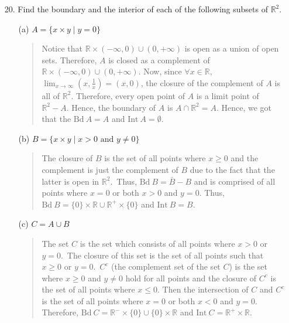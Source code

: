 \documentclass[12pt, a4paper]{article}
\newcommand{\reals}{\mathbb{R}} %
\newcommand{\preals}{\mathbb{R}^+} %
\newcommand{\nreals}{\mathbb{R}^-} %
\begin{document}
\begin{itemize}
\item[]
\item[]

\item[20.]
Find the boundary and the interior of each of the following subsets of $\reals^2$.
\begin{itemize}
\item[(a)]
$A = \{x \times y \mid y = 0\}$
\begin{quote}
Notice that $\reals \times (-\infty, 0) \cup (0, +\infty)$
is open as a union of open sets. Therefore, $A$ is closed as a complement of $\reals \times (-\infty, 0) \cup (0, +\infty)$.
Now, since $\forall x \in \reals$, $\lim_{x \to \infty} (x, \frac{1}{x}) = (x, 0)$, the closure of the complement of $A$ is all of $\reals^2$.
Therefore, every open point of $A$ is a limit point of $\reals^2 - A$. Hence, the boundary of $A$ is $A \cap \reals^2 = A$.
Hence, we got that the $\mbox{Bd} \ A = A$ and $\mbox{Int} \ A = \emptyset$.
\end{quote}

\item[]
\item[]

\item[(b)]
$B = \{x \times y \mid x > 0 \mbox{ and } y \neq 0\}$
\begin{quote}
The closure of $B$ is the set of all points where $x \geq 0$
and the complement is just the complement of $B$ due to the fact
that the latter is open in $\reals^2$.\
Thus, $\mbox{Bd} \ B = \bar{B} - B$ and is comprised of all
points where $x = 0$ or both $x > 0$ and $y = 0$.
Thus, $\mbox{Bd} \ B = \{0\} \times \reals \cup \preals \times \{0\}$
and $\mbox{Int} \ B = B$.
\end{quote}

\item[]
\item[]
\item[]
\item[]

\item[(c)]
$C = A \cup B$
\begin{quote}
The set $C$ is the set which consists of all points where $x > 0$ or $y = 0$.\
The closure of this set is the set of all points such that $x \geq 0$ or $y = 0$.\
$C^c$ (the complement set of the set $C$) is the set where $x \geq 0$ and $y \neq 0$ hold for all points
and the closure of $C^c$ is the set of all points where $x \leq 0$. Then the intersection
of $C$ and $C^c$ is the set of all points where $x = 0$ or both $x < 0$ and $y = 0$.
Therefore, $\mbox{Bd} \ C = \nreals \times \{0\} \cup \{0\} \times \reals$
and $\mbox{Int} \ C = \preals \times \reals$.


\end{quote}
\end{itemize}
\end{itemize}
\end{document}

